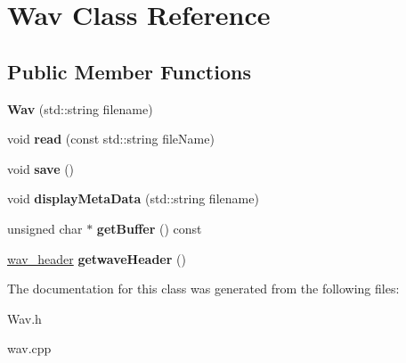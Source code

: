 \hypertarget{classWav}{}\section{Wav Class Reference}
\label{classWav}
\subsection*{Public Member Functions}
\begin{DoxyCompactItemize}
\item 
\mbox{\label{classWav_a2fee69ab4985c3a3a2a6688a758830e4}} 
{\bfseries Wav} (std\+::string filename)
\item 
\mbox{\label{classWav_a4d3a96a00149277de8280d6008a1ba4d}} 
void {\bfseries read} (const std\+::string file\+Name)
\item 
\mbox{\label{classWav_ab8ac2a53df386b529aa432ae3d3341bd}} 
void {\bfseries save} ()
\item 
\mbox{\label{classWav_abe9ad7fffa63c476065c42b73ec157fb}} 
void {\bfseries display\+Meta\+Data} (std\+::string filename)
\item 
\mbox{\label{classWav_aa713fc552ec8d011df0acede14d23295}} 
unsigned char $\ast$ {\bfseries get\+Buffer} () const
\item 
\mbox{\label{classWav_aaa8d84c13c358e0b1390144c21b75645}} 
\hyperlink{structwav__header}{wav\+\_\+header} {\bfseries getwave\+Header} ()
\end{DoxyCompactItemize}


The documentation for this class was generated from the following files\+:\begin{DoxyCompactItemize}
\item 
Wav.\+h\item 
wav.\+cpp\end{DoxyCompactItemize}
